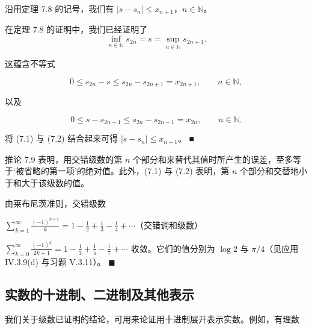 \begin{corollary}

沿用定理 7.8 的记号，我们有 $ |s - s_n| \leq x_{n+1} $，$ n \in \mathbb{N} $。

\proofhead
在定理 7.8 的证明中，我们已经证明了
\[
\inf_{n\in\mathbb{N}}s_{2n}=s=\sup_{n\in\mathbb{N}}s_{2n+1}.
\]

这蕴含不等式

\begin{equation}
0\leq s_{2n}-s\leq s_{2n}-s_{2n+1}=x_{2n+1},\qquad n\in\mathbb{N},
\end{equation}

以及

\begin{equation}
0\leq s-s_{2n-1}\leq s_{2n}-s_{2n-1}=x_{2n},\qquad n\in\mathbb{N}.
\end{equation}

将 (7.1) 与 (7.2) 结合起来可得 $ |s - s_n| \leq x_{n+1} $。 ■

\end{corollary}

推论 7.9 表明，用交错级数的第 $ n $ 个部分和来替代其值时所产生的误差，至多等于‘被省略的第一项’的绝对值。此外，(7.1) 与 (7.2) 表明，第 $ n $ 个部分和交替地小于和大于该级数的值。

\begin{example}

由莱布尼茨准则，交错级数

\begin{items}
\item

$ \sum_{k=1}^{\infty}\frac{(-1)^{k+1}}{k}=1-\frac{1}{2}+\frac{1}{3}-\frac{1}{4}+\cdots $（交错调和级数）

\item

$ \sum_{k=0}^{\infty}\frac{(-1)^{k}}{2k+1}=1-\frac{1}{3}+\frac{1}{5}-\frac{1}{7}+\cdots $
收敛。它们的值分别为 $ \log 2 $ 与 $ \pi/4 $（见应用 IV.3.9(d) 与习题 V.3.11）。 $ \blacksquare $

\end{items}

\end{example}

\subsection*{实数的十进制、二进制及其他表示}

我们关于级数已证明的结论，可用来论证用十进制展开表示实数。例如，有理数

